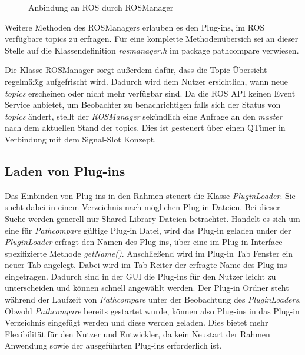 \begin{figure}[t]
  \begin{center}
  \end{center}
  \caption{Anbindung an ROS durch ROSManager}
  \label{fig:rosmanager}
\end{figure}

Weitere Methoden des ROSManagers erlauben es den Plug-ins, im ROS verfügbare
topics zu erfragen.
Für eine komplette Methodenübersich sei an dieser Stelle auf die
Klassendefinition \textit{rosmanager.h} im package pathcompare verwiesen.

Die Klasse ROSManager sorgt außerdem dafür, dass die Topic Übersicht
regelmäßig aufgefrischt wird. Dadurch wird dem Nutzer ersichtlich, wann neue
\textit{topics} erscheinen oder nicht mehr verfügbar sind. Da die
ROS \gls{API} keinen Event Service anbietet, um Beobachter zu benachrichtigen
falls sich der Status von \textit{topics} ändert, stellt der
\textit{ROSManager} sekündlich eine Anfrage an den \textit{master} nach dem
aktuellen Stand der topics. Dies ist gesteuert über einen QTimer in Verbindung
mit dem Signal-Slot Konzept.

\subsection{Laden von Plug-ins}
Das Einbinden von Plug-ins in den Rahmen steuert die Klasse
\textit{PluginLoader}. Sie sucht dabei in einem Verzeichnis nach möglichen
Plug-in Dateien. Bei dieser Suche werden generell nur Shared Library
Dateien betrachtet. Handelt es sich um eine für \textit{Pathcompare} gültige
Plug-in Datei, wird das Plug-in geladen under der \textit{PluginLoader} erfragt
den Namen des Plug-ins,
über eine im Plug-in Interface spezifizierte Methode \textit{getName()}.
Anschließend wird im Plug-in Tab Fenster ein neuer Tab angelegt. Dabei wird im
Tab Reiter der erfragte Name des Plug-ins eingetragen. Dadurch sind in der GUI
die Plug-ins für den Nutzer leicht zu unterscheiden und können schnell
angewählt werden.  Der Plug-in Ordner steht während der Laufzeit von
\textit{Pathcompare} unter der Beobachtung des \textit{PluginLoaders}.  Obwohl
\textit{Pathcompare} bereits gestartet wurde, können also Plug-ins in das
Plug-in Verzeichnis eingefügt werden und diese werden geladen. Dies bietet mehr
Flexibilität für den Nutzer und Entwickler, da kein Neustart der Rahmen
Anwendung sowie der ausgeführten Plug-ins erforderlich ist.

